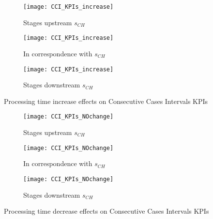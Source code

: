\begin{landscape}
\begin{figure}[p]
  \centering
  \begin{subfigure}[t]{0.4\textwidth}
    \texttt{[image: CCI\_KPIs\_increase]}
    \caption{Stages upstream $s_{CH}$}
    \label{fig:Processing time increase effects on Consecutive Cases Intervals KPIs - Stages upstream}   
  \end{subfigure}
  \begin{subfigure}[t]{0.4\textwidth}
    \texttt{[image: CCI\_KPIs\_increase]}
    \caption{In correspondence with $s_{CH}$}
    \label{fig:Processing time increase effects on Consecutive Cases Intervals KPIs - In correspondence with}   
  \end{subfigure}
  \begin{subfigure}[t]{0.4\textwidth}
    \texttt{[image: CCI\_KPIs\_increase]}
    \caption{Stages downstream $s_{CH}$}
    \label{fig:Processing time increase effects on Consecutive Cases Intervals KPIs - Stages downstream}   
  \end{subfigure}
  \caption{Processing time increase effects on Consecutive Cases Intervals KPIs}
  \label{fig:Processing time increase effects on Consecutive Cases Intervals KPIs}
\end{figure}
\begin{figure}[p]
  \centering
  \begin{subfigure}[b]{0.4\textwidth}
    \texttt{[image: CCI\_KPIs\_NOchange]}
    \caption{Stages upstream $s_{CH}$}
    \label{fig:Processing time decrease effects on Consecutive Cases Intervals KPIs - Stages upstream}   
  \end{subfigure}
  \begin{subfigure}[b]{0.4\textwidth}
    \texttt{[image: CCI\_KPIs\_NOchange]}
    \caption{In correspondence with $s_{CH}$}
    \label{fig:Processing time decrease effects on Consecutive Cases Intervals KPIs - In correspondence with}   
  \end{subfigure}
  \begin{subfigure}[b]{0.4\textwidth}
    \texttt{[image: CCI\_KPIs\_NOchange]}
    \caption{Stages downstream $s_{CH}$}
    \label{fig:Processing time decrease effects on Consecutive Cases Intervals KPIs - Stages downstream}   
  \end{subfigure}
  \caption{Processing time decrease effects on Consecutive Cases Intervals KPIs}
  \label{fig:Processing time decrease effects on Consecutive Cases Intervals KPIs}
\end{figure}
\end{landscape}
